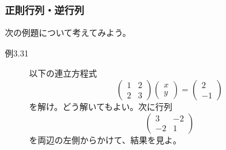 \documentclass[10pt]{jsreport}
\theoremstyle{definition}%
\numberwithin{equation}{section}%
\begin{document}
\subsubsection{正則行列・逆行列}
次の例題について考えてみよう。
\begin{description}
  \item[例3.31] 以下の連立方程式
  \begin{equation}
    \begin{pmatrix}
      1 & 2\\
      2 & 3
    \end{pmatrix}
    \begin{pmatrix}
      x\\
      y
    \end{pmatrix}=
    \begin{pmatrix}
      2\\
      -1
    \end{pmatrix}
  \end{equation}
  を解け。どう解いてもよい。次に行列
  \begin{equation}
    \begin{pmatrix}
      3 & -2\\
      -2 & 1
    \end{pmatrix}
  \end{equation}
  を両辺の左側からかけて、結果を見よ。
\end{description}
\end{document}
